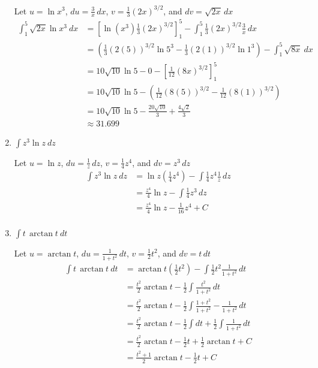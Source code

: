\documentclass[12pt]{article}
\begin{document}
\begin{enumerate}
Let $u=\ln x^3$, $\displaystyle du=\frac{3}{x}\,dx$, $v=\displaystyle\frac{1}{3}(2x)^{3/2}$, and $dv =\sqrt{2x}\,dx$
\begin{equation*}
\begin{aligned}
\int_1^5 \sqrt{2x} \ln x^3 \ dx &= \left[\ln (x^3) \frac{1}{3}(2x)^{3/2}\right]_1^5 - \int_1^5 \frac{1}{3}(2x)^{3/2}\frac{3}{x}\,dx \\
&=\left(\frac{1}{3}(2(5))^{3/2}\ln5^3-\frac{1}{3}(2(1))^{3/2}\ln1^3\right) -\int_1^5 \sqrt{8x} \ dx \\
&= 10\sqrt{10}\ln 5 - 0 - \left[\frac{1}{12}(8x)^{3/2}\right]_1^5 \\
&= 10\sqrt{10}\ln 5 - \left(\frac{1}{12}(8(5))^{3/2}-\frac{1}{12}(8(1))^{3/2}\right) \\
&= 10\sqrt{10}\ln 5 - \frac{20\sqrt{10}}{3}+\frac{4\sqrt{2}}{3} \\
&\approx 31.699
\end{aligned}
\end{equation*}

\item $\displaystyle\int z^3 \ln z \ dz$

Let $u=\ln z$, $\displaystyle du=\frac{1}{z}\,dz$, $v=\displaystyle\frac{1}{4}z^4$, and $dv =z^3\,dz$
\begin{equation*}
\begin{aligned}
\int z^3 \ln z \ dz &= \ln z \left(\frac{1}{4}z^4\right) - \int \frac{1}{4}z^4\frac{1}{z}\,dz \\
&=\frac{z^4}{4}\ln z - \int \frac{1}{4}z^3\,dz \\
&= \frac{z^4}{4}\ln z - \frac{1}{16}z^4 + C \\
\end{aligned}
\end{equation*}

\item $\displaystyle\int t\, \arctan t \ dt$

Let $u=\arctan t$, $\displaystyle du=\frac{1}{1+t^2}\,dt$, $v=\displaystyle\frac{1}{2}t^2$, and $dv =t\,dt$
\begin{equation*}
\begin{aligned}
\int t\, \arctan t \ dt &= \arctan t \left(\frac{1}{2}t^2\right) - \int \frac{1}{2}t^2 \frac{1}{1+t^2}\,dt \\
&=\frac{t^2}{2}\arctan t - \frac{1}{2} \int \frac{t^2}{1+t^2}\,dt \\
&=\frac{t^2}{2}\arctan t - \frac{1}{2} \int \frac{1+t^2}{1+t^2} -\frac{1}{1+t^2}\,dt \\
&=\frac{t^2}{2}\arctan t - \frac{1}{2} \int dt + \frac{1}{2}\int \frac{1}{1+t^2}\,dt \\
&=\frac{t^2}{2}\arctan t - \frac{1}{2}t + \frac{1}{2}\arctan t + C\\
&=\frac{t^2+1}{2}\arctan t - \frac{1}{2}t + C
\end{aligned}
\end{equation*}
\end{enumerate}
\end{document}
